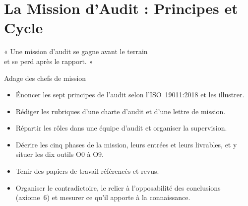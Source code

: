 
\chapter{La Mission d'Audit : Principes et Cycle}
\label{chap:mission}

\epigraph{%
    « Une mission d'audit se gagne avant le terrain\\
    et se perd après le rapport. »%
}{Adage des chefs de mission}


\begin{boxobjectifs}
\begin{itemize}
    \item Énoncer les sept principes de l'audit selon l'ISO~19011:2018 et
          les illustrer.
    \item Rédiger les rubriques d'une charte d'audit et d'une lettre de
          mission.
    \item Répartir les rôles dans une équipe d'audit et organiser la
          supervision.
    \item Décrire les cinq phases de la mission, leurs entrées et leurs
          livrables, et y situer les dix outils O0 à O9.
    \item Tenir des papiers de travail référencés et revus.
    \item Organiser le contradictoire, le relier à l'opposabilité des
          conclusions (axiome~6) et mesurer ce qu'il apporte à la
          connaissance.
\end{itemize}
\end{boxobjectifs}

